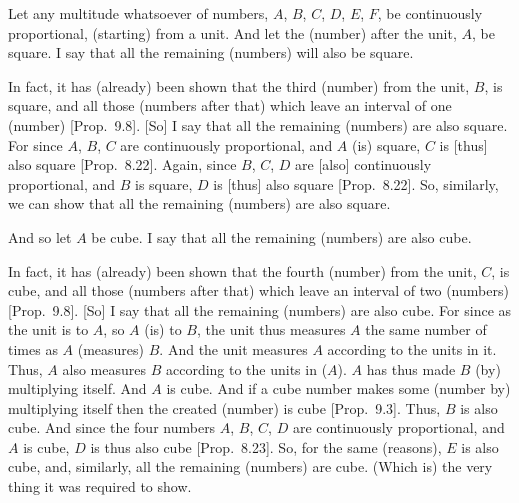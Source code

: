 \begin{Parallel}{}{}
{\epsfysize=1.8in
\centerline{}

Let any multitude whatsoever of numbers, $A$, $B$, $C$, $D$, $E$, $F$, be continuously proportional, (starting) from a unit. And let the (number) after the
unit, $A$, be square. I say that all the remaining (numbers)
will also be square.

In fact, it has (already) been shown that the third (number) from the unit, $B$, is
square, and all those (numbers after that) which leave an interval of one (number) [Prop.~9.8]. [So] I say that all the remaining (numbers) are also square. For since $A$, $B$, $C$
are continuously proportional, and $A$ (is)  square, $C$
is [thus] also  square [Prop.~8.22]. Again, 
since $B$, $C$, $D$ are [also] continuously proportional, and $B$ is
 square, $D$ is [thus] also square [Prop.~8.22]. So, similarly,
we can show that all the remaining (numbers) are also square.

And so let $A$ be  cube. I say that all the remaining (numbers)
are also cube.

In fact, it has (already) been shown that the fourth (number) from the unit, $C$, is
cube, and all those (numbers after that) which leave an interval of two (numbers) [Prop.~9.8]. [So] I say
that all the remaining (numbers) are also cube. For since as the
unit is to $A$, so $A$ (is) to $B$, the unit thus measures $A$ the same number of times as $A$ (measures) $B$. And the unit measures $A$ according to the units in it. Thus, $A$ also measures $B$ according to the
units in ($A$).
$A$ has thus made $B$ (by) multiplying itself. 
And $A$ is  cube. And if a cube number makes some (number by)
multiplying itself then the created (number) is cube  [Prop.~9.3]. Thus, $B$ is also cube.
And since the four numbers $A$, $B$, $C$, $D$ are continuously proportional, and $A$ is  cube, $D$ is thus also  cube 
 [Prop.~8.23]. So, for the same (reasons), $E$ is also
 cube, and, similarly, all the remaining (numbers) are cube. (Which is) the very thing it was required to show.}
\end{Parallel}

